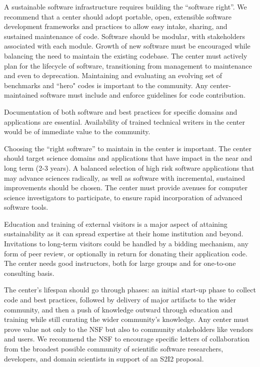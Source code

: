 A sustainable software infrastructure requires building the ``software right''. 
We recommend that a center should adopt portable, open, extensible software development frameworks and practices to allow easy intake, sharing, and sustained maintenance of code. 
Software should be modular, with stakeholders associated with each module. Growth of new software must be encouraged while balancing the need to maintain the existing codebase. 
The center must actively plan for the lifecycle of software, transitioning from management to maintenance and even to deprecation. 
Maintaining and evaluating an evolving set of benchmarks and ``hero" codes is important to the community.
Any center-maintained software must include and enforce guidelines for code contribution.

Documentation of both software and best practices for specific domains and applications are essential. 
Availability of trained technical writers in the center would be of immediate value to the community.

Choosing the ``right software'' to maintain in the center is important. 
The center should target science domains and applications that have impact in the near and long term (2-3 years). 
A balanced selection of high risk software applications that may advance sciences radically, as well as software with incremental, sustained improvements should be chosen. 
The center must provide avenues for computer science investigators to participate, to ensure rapid incorporation of advanced software tools.

Education and training of external visitors is a major aspect of attaining sustainability as it can spread expertise at their home institution and beyond. 
Invitations to long-term visitors could be handled by a bidding mechanism, any form of peer review, or optionally in return for donating their application code. 
The center needs good instructors, both for large groups and for one-to-one consulting basis.

The center's lifespan should go through phases: an initial start-up phase to collect code and best practices, 
followed by delivery of major artifacts to the wider community, 
and then a push of knowledge outward through education and training while still curating the wider community's knowledge. 
Any center must prove value not only to the NSF but also to community stakeholders like vendors and users. 
We recommend the NSF to encourage specific letters of collaboration from the broadest possible community of scientific software researchers, developers, and domain scientists in support of an S2I2 proposal.



